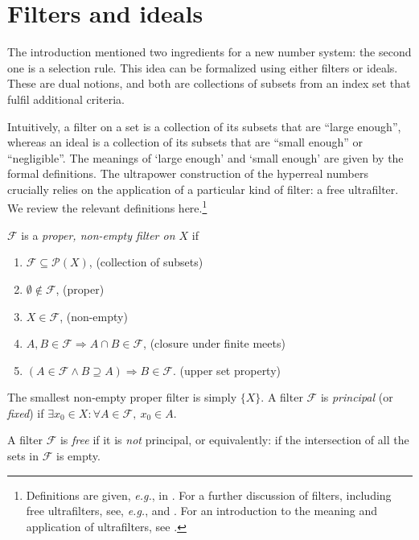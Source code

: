
\section{Filters and ideals}\label{sec:filters}
The introduction mentioned two ingredients for a new number system: the second one is a selection rule. This idea can be formalized using either filters or ideals. These are dual notions, and both are collections of subsets from an index set that fulfil additional criteria.

Intuitively, a filter on a set is a collection of its subsets that are ``large enough'', whereas an ideal is a collection of its subsets that are ``small enough'' or ``negligible''. The meanings of `large enough' and `small enough' are given by the formal definitions.
The ultrapower construction of the hyperreal numbers crucially relies on the application of a particular kind of filter: a free ultrafilter.
We review the relevant definitions here.\footnote{Definitions are given, \textit{e.g.}, in \citet[Ch.~5]{Schechter:1997}. For a further discussion of filters, including free ultrafilters, see, \textit{e.g.}, \citet[p.~18--21]{Goldblatt:1998} and \citet[section~1.1]{Cutland:1983}. For an introduction to the meaning and application of ultrafilters, see \citet{KomjathTotik:2008}.}

$\mathcal{F}$ is a \textit{proper, non-empty filter on $X$} if
\begin{enumerate}
\item[] $\mathcal{F} \subseteq \mathcal{P}(X)$, \hfill (collection of subsets)
\item[] $\emptyset \notin \mathcal{F}$, \hfill (proper)
\item[] $X \in \mathcal{F}$, \hfill (non-empty)
\item[] $A, B \in \mathcal{F} \Rightarrow A \cap B \in \mathcal{F}$, \hfill(closure under finite meets)
\item[] $(A \in \mathcal{F} \wedge B \supseteq A) \Rightarrow B \in \mathcal{F}.$ \hfill (upper set property)
\end{enumerate}
The smallest non-empty proper filter is simply $\{ X \}$. A filter $\mathcal{F}$ is \textit{principal} (or \textit{fixed}) if $\exists x_0 \in X: \forall A \in \mathcal{F}, \ x_0 \in A$.

A filter $\mathcal{F}$ is \textit{free} if it is \textit{not} principal, or equivalently: if the intersection of all the sets in $\mathcal{F}$ is empty.

